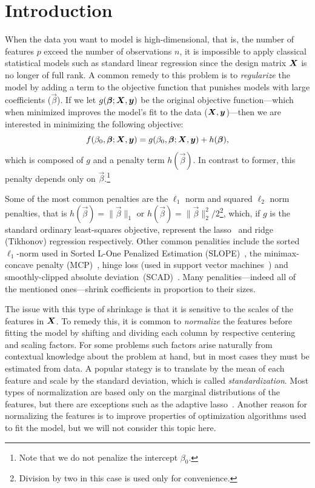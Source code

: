 \section{Introduction}

When the data you want to model is high-dimensional, that is, the number of features \(p\)
exceed the number of observations \(n\), it is impossible to apply classical statistical
models such as standard linear regression since the design matrix \(\boldsymbol X\) is no longer
of full rank. A common remedy to this problem is to \emph{regularize} the model by adding a
term to the objective function that punishes models with large coefficients
(\(\vec\beta\)). If we let \(g(\boldsymbol\beta; \boldsymbol X, \boldsymbol y)\) be the original objective
function---which when minimized improves the model's fit to the data (\(\boldsymbol X, \boldsymbol
y\))---then we are interested in minimizing the following objective:
\begin{equation}
  \label{eq:general-objective}
  f(\beta_0, \boldsymbol\beta; \boldsymbol X, \boldsymbol y) = g(\beta_0, \boldsymbol\beta; \boldsymbol X, \boldsymbol y) + h(\boldsymbol\beta),
\end{equation}
which is composed of \(g\) and a penalty term \(h(\vec\beta)\). In
contrast to former, this penalty depends only on \(\vec{\beta}\).\footnote{Note that
  we do not penalize the intercept \(\beta_0\).}

Some of the most common penalties are the \(\ell_1\) norm and squared \(\ell_2\) norm
penalties, that is \(h(\vec\beta) = \lVert \vec\beta \rVert_1\) or \(h(\vec\beta) = \lVert
\vec\beta \rVert_2^2/2\)\footnote{Division by two in this case is used only for
  convenience.}, which, if \(g\) is the standard ordinary least-squares objective, represent
the lasso~\citep{tibshirani1996,santosa1986,donoho1994} and ridge (Tikhonov) regression
respectively. Other common penalities include the sorted \(\ell_1\)-norm used in Sorted
L-One Penalized Estimation (SLOPE)~\citep{bogdan2013,bogdan2015}, the minimax-concave
penalty (MCP)~\citep{zhang2010}, hinge loss (used in support vector
machines~\citep{cortes1995}) and smoothly-clipped absolute
deviation~(SCAD)~\citep{fan2001}. Many penalities---indeed all of the mentioned
ones---shrink coefficients in proportion to their sizes.

The issue with this type of shrinkage is that it is sensitive to the scales of the features
in \(\boldsymbol X\). To remedy this, it is common to \emph{normalize} the features before fitting
the model by shifting and dividing each column by respective centering and scaling factors.
For some problems such factors arise naturally from contextual knowledge about the problem
at hand, but in most cases they must be estimated from data. A popular stategy is to
translate by the mean of each feature and scale by the standard deviation, which is called
\emph{standardization}. Most types of normalization are based only on the marginal
distributions of the features, but there are exceptions such as the adaptive
lasso~\citep{zou2006}. Another reason for normalizing the features is to improve properties
of optimization algorithms used to fit the model, but we will not consider this topic here.


